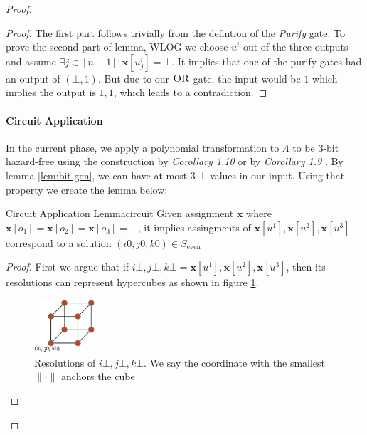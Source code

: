 \begin{proof}
\begin{proof}
    The first part follows trivially from the defintion of the \textit{Purify} gate.
    To prove the second part of lemma, WLOG we choose $u^i$ out of the three outputs and
    assume $\exists j \in [n-1]: \mathbf{x}[u^i_j] = \bot$. It implies  that one of the purify gates had an output of $(\bot, 1)$.
    But due to our $\textsc{OR}$ gate, the input would be $1$ which implies the output is $1,1$, which leads to a contradiction.
\end{proof}


\paragraph{Circuit Application}

In the current phase, we apply a polynomial transformation to $\Lambda$ to be 3-bit hazard-free using the construction
by \textit{Corollary 1.10} \cite{ikenmeyer_ComplexityHazardfreeCircuits_2019} or 
by \textit{Corollary 1.9} \cite{bund_SmallHazardFreeTransducers_2025}.
By lemma \ref{lem:bit-gen}, we can have at most 3 $\bot$ values 
in our input. Using that property we create the lemma below:

\begin{lemmabox}{Circuit Application Lemma}{circuit}
    Given assignment $\mathbf{x}$ where $\mathbf{x}[o_1] = \mathbf{x}[o_2] = \mathbf{x}[o_3] = \bot$, it implies assingments of
    $\mathbf{x}[u^1], \mathbf{x}[u^2], \mathbf{x}[u^3]$
    correspond to a solution $(i0,j0,k0) \in S_\text{even}$
\end{lemmabox}


\begin{proof}
    First we argue that if $i\bot, j\bot, k\bot = \mathbf{x}[u^1],\mathbf{x}[u^2], \mathbf{x}[u^3]$, then
    its resolutions can represent hypercubes as shown in figure \ref{fig:main-proof:cube-vis}.
    \begin{figure}[h!]
        \centering
        \includegraphics[width=0.2\textwidth]{assets/3d-cube.png}
        \caption{Resolutions of $i\bot, j\bot, k\bot$. We say the coordinate with the smallest $\|\cdot\|$ anchors the cube}\label{fig:main-proof:cube-vis}
    \end{figure}


\end{proof}
\end{proof}
